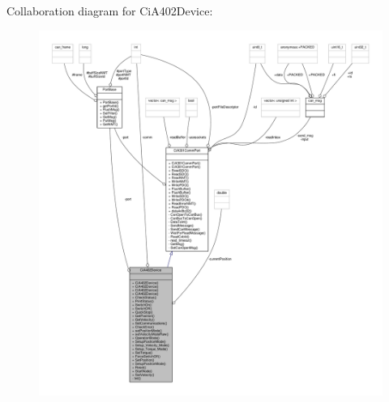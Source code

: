 Collaboration diagram for Ci\+A402\+Device\+:\nopagebreak
\begin{figure}[H]
\begin{center}
\leavevmode
\includegraphics[width=350pt]{classCiA402Device__coll__graph}
\end{center}
\end{figure}
